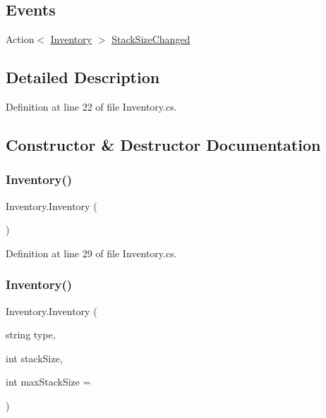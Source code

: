 \subsection*{Events}
\begin{DoxyCompactItemize}
\item 
Action$<$ \hyperlink{class_inventory}{Inventory} $>$ \hyperlink{class_inventory_a11987d6b238ea819af32fda62b1f13eb}{Stack\+Size\+Changed}
\end{DoxyCompactItemize}


\subsection{Detailed Description}


Definition at line 22 of file Inventory.\+cs.



\subsection{Constructor \& Destructor Documentation}
\mbox{\label{class_inventory_ab6c0bebea51f2ddf2015cf78b8b4aca1}} 
\subsubsection{\texorpdfstring{Inventory()}{Inventory()}\hspace{0.1cm}{\footnotesize\ttfamily [1/2]}}
{\footnotesize\ttfamily Inventory.\+Inventory (\begin{DoxyParamCaption}{ }\end{DoxyParamCaption})}



Definition at line 29 of file Inventory.\+cs.

\mbox{\label{class_inventory_a61d08071c428945e872ef87c0c2e2823}} 
\subsubsection{\texorpdfstring{Inventory()}{Inventory()}\hspace{0.1cm}{\footnotesize\ttfamily [2/2]}}
{\footnotesize\ttfamily Inventory.\+Inventory (\begin{DoxyParamCaption}\item[{string}]{type,  }\item[{int}]{stack\+Size,  }\item[{int}]{max\+Stack\+Size = {} }\end{DoxyParamCaption})}



